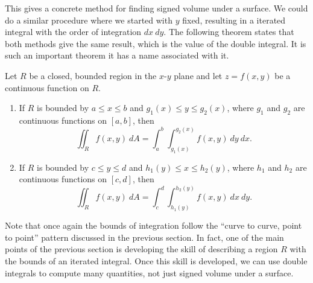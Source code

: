 This gives a concrete method for finding signed volume under a surface. We could do a similar procedure where we started with $y$ fixed, resulting in a iterated integral with the order of integration $dx\ dy$. The following theorem states that both methods give the same result, which is the value of the double integral. It is such an important theorem it has a name associated with it.

{Let $R$ be a closed, bounded region in the $x$-$y$ plane and let $z=f(x,y)$ be a continuous function on $R$.%
\begin{enumerate}
	\item If $R$ is bounded by $a\leq x\leq b$ and $g_1(x)\leq y\leq g_2(x)$, where $g_1$ and $g_2$ are continuous functions on $[a,b]$, then
	$$\iint_R f(x,y)\ dA = \int_a^b\int_{g_1(x)}^{g_2(x)} f(x,y)\ dy\ dx.$$
	
	\item If $R$ is bounded by $c\leq y\leq d$ and $h_1(y)\leq x\leq h_2(y)$, where $h_1$ and $h_2$ are continuous functions on $[c,d]$, then
	$$\iint_R f(x,y)\ dA = \int_c^d\int_{h_1(y)}^{h_2(y)} f(x,y)\ dx\ dy.$$
\end{enumerate}
}

Note that once again the bounds of integration follow the ``curve to curve, point to point'' pattern discussed in the previous section. In fact, one of the main points of the previous section is developing the skill of describing a region $R$ with the bounds of an iterated integral. Once this skill is developed, we can use double integrals to compute many quantities, not just signed volume under a surface.\\

